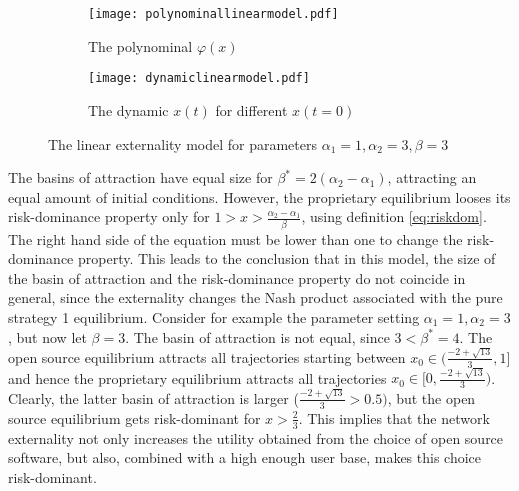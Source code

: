 \begin{figure}[h]
        \centering
        \begin{subfigure}{.5\textwidth}
        \centering
        \texttt{[image: polynominallinearmodel.pdf]}
        \caption[Polynominal of the externality model]{The polynominal $\varphi(x)$} 
        \label{fig:externalitypolynominal}
        \end{subfigure}%
        \begin{subfigure}{.5\textwidth}
        \centering
        \texttt{[image: dynamiclinearmodel.pdf]}
        \caption[Replicator dynamic of the model with externality]{The dynamic $x(t)$ for different $x(t=0)$} 
        \label{fig:dynamiclinear}
        \end{subfigure}%
        \caption[Polynominal and Dynamic of the model with externality]
        {The linear externality 
                model for parameters $\alpha_1=1,\alpha_2=3,\beta=3$}
        \label{fig:plotmodellinear}
\end{figure}
The basins of attraction have equal size for $\beta^* = 2 (\alpha_2 -\alpha_1)$,
attracting an equal amount of initial conditions. However,
the proprietary equilibrium looses its risk-dominance property 
only for $1 > x > \frac{\alpha_2-\alpha_1}{\beta}  $, using definition 
\ref{eq:riskdom}. The right hand side of the equation must be lower than one 
to change the risk-dominance property. This leads to the conclusion 
that in this model, the size of the basin of attraction and the risk-dominance
property do not coincide in general, since the externality changes the Nash 
product associated with the pure strategy 1 equilibrium. Consider for example 
the parameter setting $\alpha_1 =1, \alpha_2=3$, but now let $\beta=3$. 
The basin of attraction is not equal, since $3<\beta^*= 4$. 
The open source equilibrium attracts all trajectories starting between 
$x_0 \in (\frac{-2+\sqrt{13}}{3},1]$ and hence the proprietary equilibrium attracts
all trajectories $x_0 \in [0,\frac{-2+\sqrt{13}}{3})$. Clearly, the latter basin of 
attraction is larger ($\frac{-2+\sqrt{13}}{3}>0.5)$, 
but the open source equilibrium gets risk-dominant for
$x>\frac 23$. This implies that the network externality not only increases the
utility obtained from the choice of open source software, but also,
combined with a high enough user base, makes this choice risk-dominant. 

